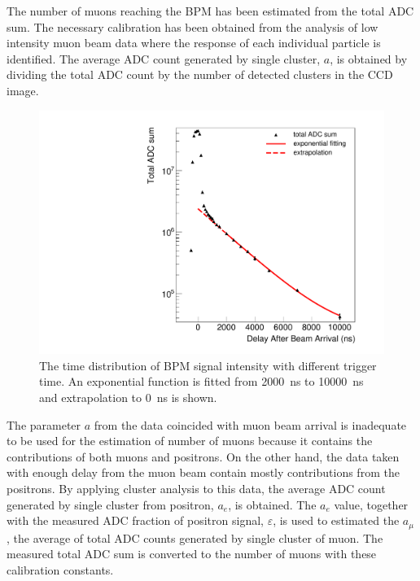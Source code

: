 \documentclass[preprint,3p,twocolumn]{elsarticle}
\begin{document}
The number of muons reaching the BPM has been estimated from the total ADC sum. The necessary calibration has been obtained from the analysis of low intensity muon beam data where the response of each individual particle is identified. The average ADC count generated by single cluster, $a$, is obtained by dividing the total ADC count by the number of detected clusters in the CCD image.
\begin{figure}[bt]
	\begin{minipage}[t]{60mm}
		\includegraphics[width=1.3\textwidth, height=1.3\textwidth]{figure/Decay_v3.pdf}
	\end{minipage}
	\caption{The time distribution of BPM signal intensity with different trigger time. An exponential function is fitted from \SI{2000}{\ns} to \SI{10000}{\ns} and extrapolation to \SI{0}{\ns} is shown.}
	\label{fig:time_distribution}
\end{figure}

The parameter $a$ from the data coincided with muon beam arrival is inadequate to be used for the estimation of number of muons because it contains the contributions of both muons and positrons. On the other hand, the data taken with enough delay from the muon beam contain mostly contributions from the positrons. By applying cluster analysis to this data, the average ADC count generated by single cluster from positron, $a_e$, is obtained. The $a_e$ value, together with the measured ADC fraction of positron signal, $\varepsilon$, is used to estimated the $a_\mu$, the average of total ADC counts generated by single cluster of muon. The measured total ADC sum is converted to the number of muons with these calibration constants.
\end{document}
